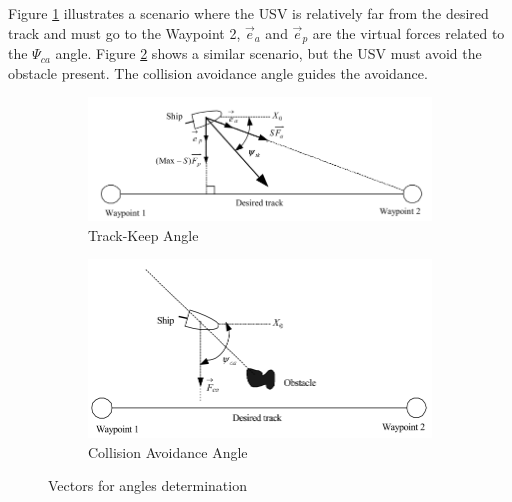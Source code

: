     Figure \ref{fig:Lee2004Fuzzy_tkAngle} illustrates a scenario where the \ac{USV} is relatively far from the desired track and must go to the Waypoint 2, $\vec{e}_a$  and $\vec{e}_p$ are the virtual forces related to the $\Psi_{ca}$ angle. Figure \ref{fig:Lee2004Fuzzy_caAngle} shows a similar scenario, but the \ac{USV} must avoid the obstacle present. The collision avoidance angle guides the avoidance.
    \begin{figure}[H]
    \centering
        \begin{subfigure}[b]{0.5\textwidth}
            \centering
            \includegraphics[width=\textwidth]{figs/Lee2004Fuzzy_tkAngle.png}
            \caption{Track-Keep Angle}
            \label{fig:Lee2004Fuzzy_tkAngle}
        \end{subfigure}
        \begin{subfigure}[b]{0.4\textwidth}
            \centering
            \includegraphics[width=\textwidth]{figs/Lee2004Fuzzy_caAngle.png}
            \caption{Collision Avoidance Angle}
            \label{fig:Lee2004Fuzzy_caAngle}
        \end{subfigure}
    
    \caption{Vectors for angles determination \cite{Lee2004Fuzzy}}
    \label{fig:Lee2004Fuzzy_Angles}
    \end{figure}
    
